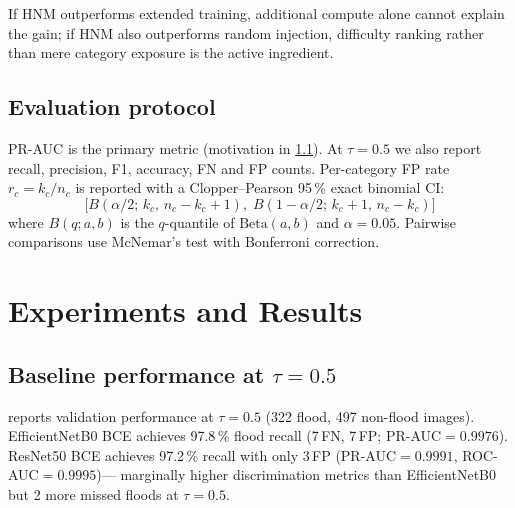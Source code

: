 \documentclass[a4paper,fleqn]{cas-sc}
\newcommand{\EffNet}{EfficientNetB0\xspace}
\newcommand{\ResNet}{ResNet50\xspace}
\newcommand{\PR}{PR-AUC\xspace}
\newcommand{\CP}{Clopper--Pearson\xspace}
\begin{document}
If HNM outperforms extended training, additional compute alone cannot explain the gain;
if HNM also outperforms random injection, difficulty ranking rather than mere category exposure is the active ingredient.

\subsection{Evaluation protocol}
\label{sec:methods:eval}

\PR{} is the primary metric (motivation in \cref{sec:results:baseline}).
At $\tau{=}0.5$ we also report recall, precision, F1, accuracy, FN and FP counts.
Per-category FP rate $r_c = k_c / n_c$ is reported with a \CP{} 95\,\% exact binomial CI:
\begin{equation}
  \bigl[
    B(\alpha/2;\, k_c,\, n_c - k_c + 1),\;
    B(1 - \alpha/2;\, k_c + 1,\, n_c - k_c)
  \bigr]
  \label{eq:cp}
\end{equation}
where $B(q; a, b)$ is the $q$-quantile of $\text{Beta}(a,b)$ and $\alpha{=}0.05$.
Pairwise comparisons use McNemar's test \cite{McNemar1947} with Bonferroni correction.

\section{Experiments and Results}
\label{sec:results}

\subsection{Baseline performance at $\tau = 0.5$}
\label{sec:results:baseline}

 reports validation performance at $\tau{=}0.5$ (322 flood, 497 non-flood images).
\EffNet{} BCE achieves 97.8\,\% flood recall (7\,FN, 7\,FP; \PR{}$=0.9976$).
\ResNet{} BCE achieves 97.2\,\% recall with only 3\,FP (\PR{}$=0.9991$, ROC-AUC$=0.9995$)---
marginally higher discrimination metrics than \EffNet{} but 2 more missed floods at $\tau{=}0.5$.
\end{document}

